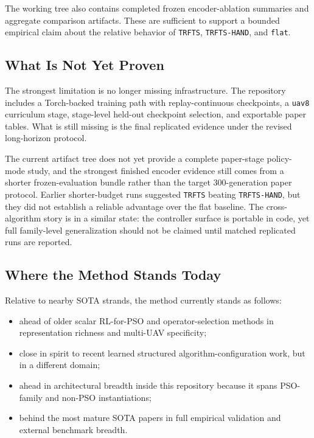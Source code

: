 \documentclass[a4paper,fleqn]{cas-sc}
\begin{document}
The working tree also contains completed frozen encoder-ablation summaries and aggregate comparison artifacts. These are sufficient to support a bounded empirical claim about the relative behavior of \texttt{TRFTS}, \texttt{TRFTS-HAND}, and \texttt{flat}.

\subsection{What Is Not Yet Proven}

The strongest limitation is no longer missing infrastructure. The repository includes a Torch-backed training path with replay-continuous checkpoints, a \texttt{uav8} curriculum stage, stage-level held-out checkpoint selection, and exportable paper tables. What is still missing is the final replicated evidence under the revised long-horizon protocol.

The current artifact tree does not yet provide a complete paper-stage policy-mode study, and the strongest finished encoder evidence still comes from a shorter frozen-evaluation bundle rather than the target 300-generation paper protocol. Earlier shorter-budget runs suggested \texttt{TRFTS} beating \texttt{TRFTS-HAND}, but they did not establish a reliable advantage over the flat baseline. The cross-algorithm story is in a similar state: the controller surface is portable in code, yet full family-level generalization should not be claimed until matched replicated runs are reported.

\subsection{Where the Method Stands Today}

Relative to nearby SOTA strands, the method currently stands as follows:
\begin{itemize}
\item ahead of older scalar RL-for-PSO and operator-selection methods in representation richness and multi-UAV specificity;
\item close in spirit to recent learned structured algorithm-configuration work, but in a different domain;
\item ahead in architectural breadth inside this repository because it spans PSO-family and non-PSO instantiations;
\item behind the most mature SOTA papers in full empirical validation and external benchmark breadth.
\end{itemize}
\end{document}

